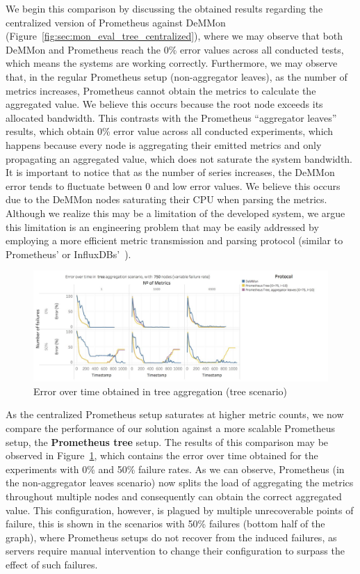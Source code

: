 We begin this comparison by discussing the obtained results regarding the centralized version of Prometheus against DeMMon (Figure~\ref{fig:sec:mon_eval_tree_centralized}), where we may observe that both DeMMon and Prometheus reach the 0\% error values across all conducted tests, which means the systems are working correctly. Furthermore, we may observe that, in the regular Prometheus setup (non-aggregator leaves), as the number of metrics increases, Prometheus cannot obtain the metrics to calculate the aggregated value. We believe this occurs because the root node exceeds its allocated bandwidth. This contrasts with the Prometheus ``aggregator leaves'' results, which obtain 0\% error value across all conducted experiments, which happens because every node is aggregating their emitted metrics and only propagating an aggregated value, which does not saturate the system bandwidth. It is important to notice that as the number of series increases, the DeMMon error tends to fluctuate between 0 and low error values. We believe this occurs due to the DeMMon nodes saturating their CPU when parsing the metrics. Although we realize this may be a limitation of the developed system, we argue this limitation is an engineering problem that may be easily addressed by employing a more efficient metric transmission and parsing protocol (similar to Prometheus' or InfluxDBs'~\cite{influxdb_data_elements}).

\begin{figure}
    \centering
    \includegraphics[width=\linewidth]{Chapters/evaluation/figures/aggregation/Error_over_time_tree_tree.jpg}
    \caption{Error over time obtained in tree aggregation (tree scenario)}
    \label{fig:sec:mon_eval_tree_tree}
\end{figure}

As the centralized Prometheus setup saturates at higher metric counts, we now compare the performance of our solution against a more scalable Prometheus setup, the \textbf{Prometheus tree} setup. The results of this comparison may be observed in Figure~\ref{fig:sec:mon_eval_tree_tree}, which contains the error over time obtained for the experiments with 0\% and 50\% failure rates. As we can observe, Prometheus (in the non-aggregator leaves scenario) now splits the load of aggregating the metrics throughout multiple nodes and consequently can obtain the correct aggregated value. This configuration, however, is plagued by multiple unrecoverable points of failure, this is shown in the scenarios with 50\% failures (bottom half of the graph), where Prometheus setups do not recover from the induced failures, as servers require manual intervention to change their configuration to surpass the effect of such failures.

